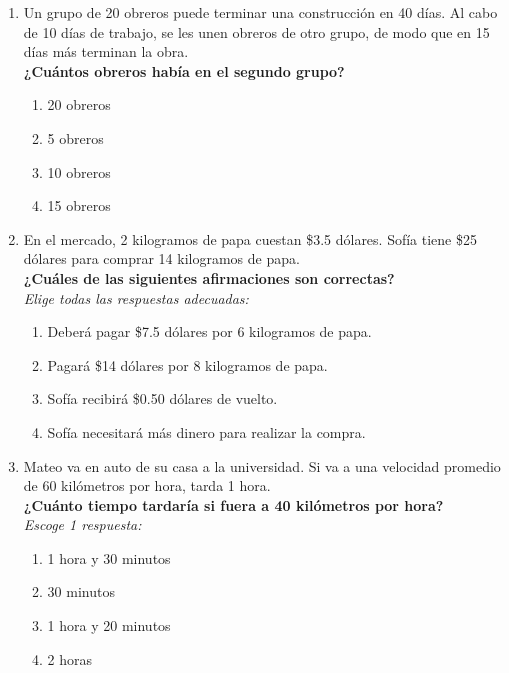 \documentclass[11pt]{book}
\begin{document}
\begin{enumerate}[start=1]%
  \item Un grupo de 20 obreros puede terminar una
        construcción en 40 días. Al cabo de 10 días de trabajo,
        se les unen obreros de otro grupo, de modo que en 15 días
        más terminan la obra.\\
        \textbf{¿Cuántos obreros había en el segundo grupo?}\\
        \begin{enumerate}
          \item 20 obreros
          \item 5 obreros
          \item 10 obreros
          \item 15 obreros
        \end{enumerate}

  \item En el mercado, 2 kilogramos de papa cuestan \$3.5 dólares.
        Sofía tiene \$25 dólares para comprar 14 kilogramos de papa.\\
        \textbf{¿Cuáles de las siguientes afirmaciones son correctas?}\\
        \emph{Elige todas las respuestas adecuadas:}\\
        \begin{enumerate}
          \item Deberá pagar \$7.5 dólares por 6 kilogramos de papa.
          \item Pagará \$14 dólares por 8 kilogramos de papa.
          \item Sofía recibirá \$0.50 dólares de vuelto.
          \item Sofía necesitará más dinero para realizar la compra.
        \end{enumerate}

  \item Mateo va en auto de su casa a la universidad. Si va a una velocidad promedio de 60 kilómetros por hora, tarda 1 hora.\\
        \textbf{¿Cuánto tiempo tardaría si fuera a 40 kilómetros por hora?}\\
        \emph{Escoge 1 respuesta:}\\
        \begin{enumerate}
          \item 1 hora y 30 minutos
          \item 30 minutos
          \item 1 hora y 20 minutos
          \item 2 horas
        \end{enumerate}


\end{enumerate}
\end{document}
